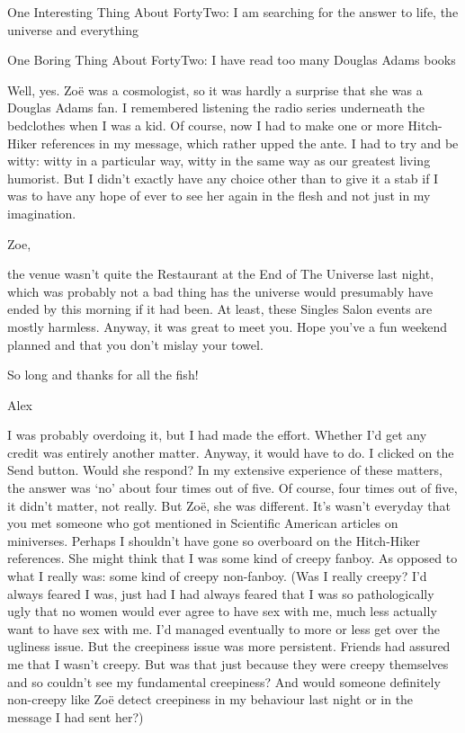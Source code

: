 One Interesting Thing About FortyTwo: I am searching for the answer
to life, the universe and everything

One Boring Thing About FortyTwo: I have read too many Douglas Adams
books

Well, yes. Zoë was a cosmologist, so it was hardly a surprise
that she was a Douglas Adams fan. I remembered listening the radio
series underneath the bedclothes when I was a kid. Of course, now I
had to make one or more {\twelvesl Hitch-Hiker\/} references in my
message, which rather upped the ante. I had to try and be witty:
witty in a particular way, witty in the same way as our greatest
living humorist. But I didn't exactly have any choice other than to
give it a stab if I was to have any hope of ever to see her again in
the flesh and not just in my imagination.

{\twelvett
Zoe,

the venue wasn't quite the Restaurant at the End of The Universe
last night, which was probably not a bad thing has the universe
would presumably have ended by this morning if it had been. At
least, these Singles Salon events are mostly harmless. Anyway, it
was great to meet you. Hope you've a fun weekend planned and that
you don't mislay your towel.

So long and thanks for all the fish!

Alex}

I was probably overdoing it, but I had made the effort. Whether I'd
get any credit was entirely another matter. Anyway, it would have to
do. I clicked on the Send button. Would she respond? In my extensive
experience of these matters, the answer was `no' about four times
out of five. Of course, four times out of five, it didn't matter,
not really. But Zoë, she was different. It's wasn't everyday
that you met someone who got mentioned in {\twelvesl Scientific
American\/} articles on miniverses. Perhaps I shouldn't have gone so
overboard on the {\twelvesl Hitch-Hiker\/} references. She might
think that I was some kind of creepy fanboy. As opposed to what I
really was: some kind of creepy non-fanboy. (Was I really creepy?
I'd always feared I was, just had I had always feared that I was so
pathologically ugly that no women would ever agree to have sex with
me, much less actually {\twelveit want\/} to have sex with me. I'd
managed eventually to more or less get over the ugliness issue. But
the creepiness issue was more persistent. Friends had assured me
that I wasn't creepy. But was that just because they were creepy
themselves and so couldn't see my fundamental creepiness? And would
someone definitely non-creepy like Zoë detect creepiness in my
behaviour last night or in the message I had sent her?)

